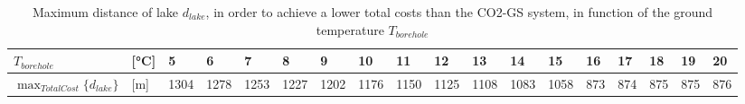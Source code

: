 \begin{table}[htp]
	\centering
	\caption{Maximum distance of lake $d_{lake}$, in order to achieve a lower total costs than the CO2-GS system, in function of the ground temperature $T_{borehole}$}
	\label{tab:lakeDist}
\begin{tabular}{llllllllllllllllll}
	\toprule
	$T_{borehole}$                    & [\si{\celsius}] & 5    & 6    & 7    & 8    & 9    & 10   & 11   & 12   & 13   & 14   & 15   & 16  & 17  & 18  & 19  & 20 \\ \midrule
	$\max_{TotalCost} \{ d_{lake} \}$ & [m]             & 1304 & 1278 & 1253 & 1227 & 1202 & 1176 & 1150 & 1125 & 1108 & 1083 & 1058 & 873& 874 & 875 & 875 & 876  \\ \bottomrule
\end{tabular}
\end{table}